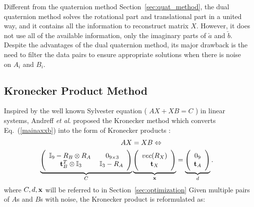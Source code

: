 \documentclass[twocolumn,10pt]{asme2ej}
\newcommand{\ttt}{{\bf t}}
\begin{document}
Different from the quaternion method Section~\ref{sec:quat_method}, the dual quaternion method solves the rotational part and translational part in a united way, and it contains all the information to reconstruct matrix $X$. However, it does not use all of the available information, only the imaginary parts of $\check{a}$ and $\check{b}$. Despite the advantages of the dual quaternion method, its major drawback is the need to filter the data pairs to ensure appropriate solutions when there is noise on $A_{i}$ and $B_{i}$.

\subsection{Kronecker Product Method }
\label{sec:Kronecker}
Inspired by the well known Sylvester equation ( $AX + XB = C$ ) in linear systems, Andreff {\it et al}. \cite{andreff1999line} proposed the Kronecker method which converts  Eq.~(\ref{mainaxxb}) into the form of Kronecker products \cite{andreff1999line}: %
\begin{equation}
\begin{split}
AX &= XB  \Leftrightarrow\\
\underbrace{\Bigg(
\begin{array}{cc}
\mathbb{I}_{9} - R_{B} \otimes R_{A} \; & \; 0_{9 \times 3}\\
\ttt_{B}^{T} \otimes \mathbb{I}_{3} & \mathbb{I}_{3} - R_{A}
\end{array}
\Bigg)}_{C}
&\underbrace{\Bigg(
\begin{array}{c}
vec(R_{X})\\
\ttt_{X}
\end{array}
\Bigg)}_{\bf x} =
\underbrace{
\Bigg(
\begin{array}{c}
0_{9}\\
\ttt_{A}
\end{array}
\Bigg)}_{d}.
\end{split}
\label{KroneckerMethod}
\end{equation}
where $C, d, \bf x$ will be referred to in Section~\ref{sec:optimization}
Given multiple pairs of $A$s and $B$s with noise, the Kronecker product is reformulated as:%
\end{document}
